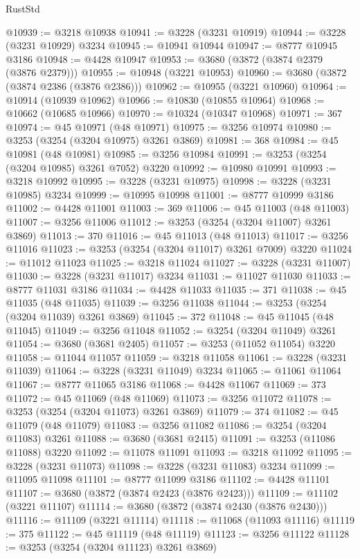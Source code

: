 \begin{lexlean}{RustStd}
\begin{coremodule}
@10939 := @3218 @10938
@10941 := @3228 (@3231 @10919)
@10944 := @3228 (@3231 @10929) @3234
@10945 := @10941 @10944
@10947 := @8777 @10945 @3186
@10948 := @4428 @10947
@10953 := @3680 (@3872 (@3874 @2379 (@3876 @2379)))
@10955 := @10948 (@3221 @10953)
@10960 := @3680 (@3872 (@3874 @2386 (@3876 @2386)))
@10962 := @10955 (@3221 @10960)
@10964 := @10914 (@10939 @10962)
@10966 := @10830 (@10855 @10964)
@10968 := @10662 (@10685 @10966)
@10970 := @10324 (@10347 @10968)
@10971 := 367
@10974 := @45 @10971 (@48 @10971)
@10975 := @3256 @10974
@10980 := @3253 (@3254 (@3204 @10975) @3261 @3869)
@10981 := 368
@10984 := @45 @10981 (@48 @10981)
@10985 := @3256 @10984
@10991 := @3253 (@3254 (@3204 @10985) @3261 @7052) @3220
@10992 := @10980 @10991
@10993 := @3218 @10992
@10995 := @3228 (@3231 @10975)
@10998 := @3228 (@3231 @10985) @3234
@10999 := @10995 @10998
@11001 := @8777 @10999 @3186
@11002 := @4428 @11001
@11003 := 369
@11006 := @45 @11003 (@48 @11003)
@11007 := @3256 @11006
@11012 := @3253 (@3254 (@3204 @11007) @3261 @3869)
@11013 := 370
@11016 := @45 @11013 (@48 @11013)
@11017 := @3256 @11016
@11023 := @3253 (@3254 (@3204 @11017) @3261 @7009) @3220
@11024 := @11012 @11023
@11025 := @3218 @11024
@11027 := @3228 (@3231 @11007)
@11030 := @3228 (@3231 @11017) @3234
@11031 := @11027 @11030
@11033 := @8777 @11031 @3186
@11034 := @4428 @11033
@11035 := 371
@11038 := @45 @11035 (@48 @11035)
@11039 := @3256 @11038
@11044 := @3253 (@3254 (@3204 @11039) @3261 @3869)
@11045 := 372
@11048 := @45 @11045 (@48 @11045)
@11049 := @3256 @11048
@11052 := @3254 (@3204 @11049) @3261
@11054 := @3680 (@3681 @2405)
@11057 := @3253 (@11052 @11054) @3220
@11058 := @11044 @11057
@11059 := @3218 @11058
@11061 := @3228 (@3231 @11039)
@11064 := @3228 (@3231 @11049) @3234
@11065 := @11061 @11064
@11067 := @8777 @11065 @3186
@11068 := @4428 @11067
@11069 := 373
@11072 := @45 @11069 (@48 @11069)
@11073 := @3256 @11072
@11078 := @3253 (@3254 (@3204 @11073) @3261 @3869)
@11079 := 374
@11082 := @45 @11079 (@48 @11079)
@11083 := @3256 @11082
@11086 := @3254 (@3204 @11083) @3261
@11088 := @3680 (@3681 @2415)
@11091 := @3253 (@11086 @11088) @3220
@11092 := @11078 @11091
@11093 := @3218 @11092
@11095 := @3228 (@3231 @11073)
@11098 := @3228 (@3231 @11083) @3234
@11099 := @11095 @11098
@11101 := @8777 @11099 @3186
@11102 := @4428 @11101
@11107 := @3680 (@3872 (@3874 @2423 (@3876 @2423)))
@11109 := @11102 (@3221 @11107)
@11114 := @3680 (@3872 (@3874 @2430 (@3876 @2430)))
@11116 := @11109 (@3221 @11114)
@11118 := @11068 (@11093 @11116)
@11119 := 375
@11122 := @45 @11119 (@48 @11119)
@11123 := @3256 @11122
@11128 := @3253 (@3254 (@3204 @11123) @3261 @3869)

\end{coremodule}
\end{lexlean}
